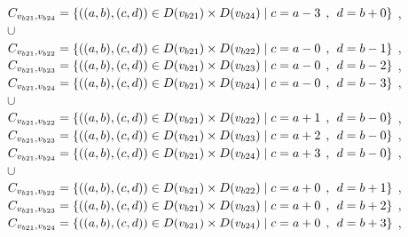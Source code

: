 \\$C_{v_{b21},v_{b24}}=\{((a,b),(c,d))\in D(v_{b21}) \times D(v_{b24})\mid c = a - 3\hspace{1ex} , \hspace{1ex}  d = b + 0 \}$ , 
\\$\cup$
\\$C_{v_{b21},v_{b22}}=\{((a,b),(c,d))\in D(v_{b21}) \times D(v_{b22})\mid c = a - 0\hspace{1ex} , \hspace{1ex}  d = b - 1 \}$ , 
\\$C_{v_{b21},v_{b23}}=\{((a,b),(c,d))\in D(v_{b21}) \times D(v_{b23})\mid c = a - 0\hspace{1ex} , \hspace{1ex}  d = b - 2 \}$ , 
\\$C_{v_{b21},v_{b24}}=\{((a,b),(c,d))\in D(v_{b21}) \times D(v_{b24})\mid c = a - 0\hspace{1ex} , \hspace{1ex}  d = b - 3 \}$ , 
\\$\cup$
\\$C_{v_{b21},v_{b22}}=\{((a,b),(c,d))\in D(v_{b21}) \times D(v_{b22})\mid c = a + 1\hspace{1ex} , \hspace{1ex}  d = b - 0 \}$ , 
\\$C_{v_{b21},v_{b23}}=\{((a,b),(c,d))\in D(v_{b21}) \times D(v_{b23})\mid c = a + 2\hspace{1ex} , \hspace{1ex}  d = b - 0 \}$ , 
\\$C_{v_{b21},v_{b24}}=\{((a,b),(c,d))\in D(v_{b21}) \times D(v_{b24})\mid c = a + 3\hspace{1ex} , \hspace{1ex}  d = b - 0 \}$ , 
\\$\cup$
\\$C_{v_{b21},v_{b22}}=\{((a,b),(c,d))\in D(v_{b21}) \times D(v_{b22})\mid c = a + 0\hspace{1ex} , \hspace{1ex}  d = b + 1 \}$ , 
\\$C_{v_{b21},v_{b23}}=\{((a,b),(c,d))\in D(v_{b21}) \times D(v_{b23})\mid c = a + 0\hspace{1ex} , \hspace{1ex}  d = b + 2 \}$ , 
\\$C_{v_{b21},v_{b24}}=\{((a,b),(c,d))\in D(v_{b21}) \times D(v_{b24})\mid c = a + 0\hspace{1ex} , \hspace{1ex}  d = b + 3 \}$ , 
